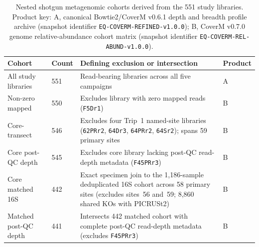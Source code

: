 \begin{revision}
\begin{table}[h]
\centering
\caption{Nested shotgun metagenomic cohorts derived from the 551 study libraries. Product key: A, canonical Bowtie2/CoverM v0.6.1 depth and breadth profile archive (snapshot identifier \texttt{EQ-COVERM-REFINED-v1.0.0}); B, CoverM v0.7.0 genome relative-abundance cohort matrix (snapshot identifier \texttt{EQ-COVERM-REL-ABUND-v1.0.0}).}
\label{tab:shotgun_cohorts}
\small
\begin{tabular}{p{} p{} p{} p{}}
\toprule
\textbf{Cohort} & \textbf{Count} & \textbf{Defining exclusion or intersection} & \textbf{Product} \\
\midrule
All study libraries & 551 & Read-bearing libraries across all five campaigns & A \\
Non-zero mapped & 550 & Excludes library with zero mapped reads (\texttt{F5Dr1}) & B \\
Core-transect & 546 & Excludes four Trip~1 named-site libraries (\texttt{62PRr2}, \texttt{64Dr3}, \texttt{64PRr2}, \texttt{64Sr2}); spans 59 primary sites & B \\
Core post-QC depth & 545 & Excludes core library lacking post-QC read-depth metadata (\texttt{F45PRr3}) & B \\
Core matched 16S & 442 & Exact specimen join to the 1,186-sample deduplicated 16S cohort across 58 primary sites (excludes sites~56 and~59; 8,860 shared KOs with PICRUSt2) & B \\
Matched post-QC depth & 441 & Intersects 442 matched cohort with complete post-QC read-depth metadata (excludes \texttt{F45PRr3}) & B \\
\bottomrule
\end{tabular}
\end{table}









\end{revision}

